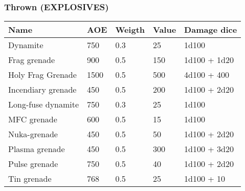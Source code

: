 
\subsubsection{Thrown (EXPLOSIVES)}
\begin{longtable}{|p{4cm}|p{1.5cm}|p{1.5cm}|p{2cm}|p{4cm}|}
\hline
\bfseries Name & \bfseries AOE & \bfseries Weigth & \bfseries Value & \bfseries Damage dice \\
\hline
\endhead
Dynamite & 750 & 0.3 & 25 & 1d100 \\
Frag grenade & 900 & 0.5 & 150 & 1d100 + 1d20 \\
Holy Frag Grenade & 1500 & 0.5 & 500 & 4d100 + 400 \\
Incendiary grenade & 450 & 0.5 & 200 & 1d100 + 2d20 \\
Long-fuse dynamite & 750 & 0.3 & 25 & 1d100 \\
MFC grenade & 600 & 0.5 & 15 & 1d100 \\
Nuka-grenade & 450 & 0.5 & 50 & 1d100 + 2d20 \\
Plasma grenade & 450 & 0.5 & 300 & 1d100 + 3d20 \\
Pulse grenade & 750 & 0.5 & 40 & 1d100 + 2d20 \\
Tin grenade & 768 & 0.5 & 25 & 1d100 + 10 \\
\hline
\end{longtable}

